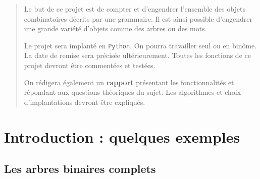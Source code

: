 \documentclass[11pt]{article}
\newcommand{\Python}{\texttt{Python}}
\begin{document}
\maketitle

\begin{abstract}
  Le but de ce projet est de compter et d'engendrer l'ensemble des objets
  combinatoires décrits par une grammaire. Il est ainsi possible d'engendrer
  une grande variété d'objets comme des arbres ou des mots.  \smallskip

  Le projet sera implanté en \Python{}. On pourra travailler seul ou en
  binôme. La date de remise sera précisée ultérieurement. Toutes les fonctions
  de ce projet devront être commentées et testées.

  On rédigera également un \textbf{rapport} présentant les fonctionnalités et
  répondant aux questions théoriques du sujet. Les algorithmes et choix
  d'implantations devront être expliqués. 
\end{abstract}

\section{Introduction : quelques exemples}


\subsection{Les arbres binaires complets}
\end{document}
